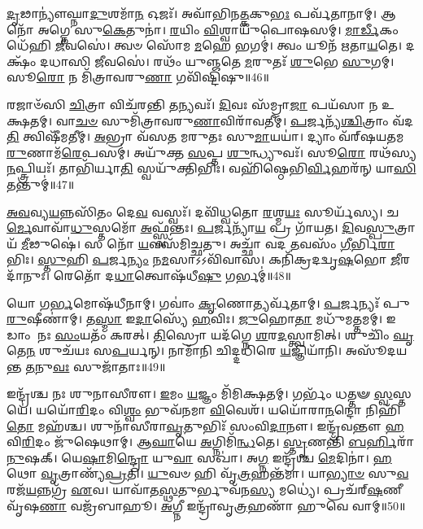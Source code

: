 \-\ul{𑌦𑍃}\-𑌢𑌾𑌨𑍍𑌯𑍗॑𑌘𑍍𑌨𑌾\-\ul{𑌦𑍁}\-𑌶𑌮𑌾᳴\-\ul{𑌨} 𑌓𑌜𑌃᳴।
𑌅𑌵𑌾᳴𑌭𑌿𑌨\-\ul{𑌤𑍍𑌕}\-𑌕𑍁\-\ul{𑌭𑌃} 𑌪𑌰𑍍𑌵᳴𑌤𑌾𑌨𑌾𑌮𑍍।
𑌆 𑌨𑍋᳴ 𑌅𑌗𑍍𑌨𑍇 𑌸𑍁\-\ul{𑌕𑍇}\-𑌤𑍁𑌨𑌾॑।
\-\ul{𑌰}\-𑌯𑌿𑌂 \ul{𑌵𑌿}\-𑌶𑍍𑌵𑌾𑌯𑍁᳴𑌪𑍋𑌷𑌸𑌮𑍍।
\-\ul{𑌮𑌾}\-\-\ul{𑌰𑍍𑌡𑍀}\-𑌕𑌂 𑌧𑍇᳴𑌹𑌿 \ul{𑌜𑍀}\-𑌵𑌸𑍇॑।
𑌤𑍍𑌵𑍞 𑌸𑍋᳴𑌮 \ul{𑌮}\-𑌹𑍇 𑌭𑌗𑌮𑍍॑।
𑌤𑍍𑌵𑌂 𑌯𑍂𑌨᳴ 𑌋𑌤𑌾\-\ul{𑌯}\-𑌤𑍇।
𑌦𑌕𑍍𑌷𑌂᳴ 𑌦𑌧𑌾𑌸𑌿 \ul{𑌜𑍀}\-𑌵𑌸𑍇॑।
𑌰𑌥𑌂᳴ 𑌯𑍁𑌞𑍍𑌜𑌤𑍇 \ul{𑌮}\-𑌰𑍁𑌤𑌃᳴ \ul{𑌶𑍁}\-𑌭𑍇 \ul{𑌸𑍁}\-𑌗𑌮𑍍।
𑌸𑍂\-\ul{𑌰𑍋} 𑌨 𑌮𑌿᳴𑌤𑍍𑌰𑌾𑌵𑌰𑍁\-\ul{𑌣𑌾} 𑌗𑌵𑌿᳴𑌷𑍍𑌟𑌿𑌷𑍁॥46॥

𑌰𑌜𑌾𑍞᳴𑌸𑌿 \ul{𑌚𑌿}\-𑌤𑍍𑌰𑌾 𑌵𑌿𑌚᳴𑌰𑌨𑍍𑌤𑌿 \ul{𑌤}\-𑌨𑍍𑌯𑌵𑌃᳴।
\-\ul{𑌦𑌿}\-𑌵𑌃 𑌸᳴𑌮𑍍𑌰𑌾\-\ul{𑌜𑌾} 𑌪𑌯᳴𑌸𑌾 𑌨 𑌉𑌕𑍍𑌷𑌤𑌮𑍍।
𑌵𑌾\-\ul{𑌚}\-\-\ul{𑍞} 𑌸𑍁𑌮𑌿᳴𑌤𑍍𑌰𑌾𑌵𑌰𑍁\-\ul{𑌣𑌾}\-𑌵𑌿𑌰𑌾᳴𑌵𑌤𑍀𑌮𑍍।
\-\ul{𑌪}\-𑌰𑍍𑌜𑌨𑍍𑌯᳴\-\ul{𑌶𑍍𑌚𑌿}\-𑌤𑍍𑌰𑌾𑌂 𑌵᳴𑌦\-\ul{𑌤𑌿} 𑌤𑍍𑌵𑌿𑌷𑍀᳴𑌮𑌤𑍀𑌮𑍍।
\-\ul{𑌅}\-𑌭𑍍𑌰𑌾 𑌵᳴𑌸𑌤 𑌮𑌰𑍁𑌤𑌃 𑌸𑍁\-\ul{𑌮𑌾}\-𑌯𑌯𑌾॑।
𑌦𑍍𑌯𑌾𑌂 𑌵᳴𑌰𑍍‌\mbox{}𑌷𑌯𑌤𑌮\-\ul{𑌰𑍁}\-𑌣𑌾𑌮᳴\-\ul{𑌰𑍇}\-𑌪𑌸𑌮𑍍॑।
𑌅𑌯𑍁᳴𑌕𑍍𑌤 \ul{𑌸}\-𑌪𑍍𑌤 \ul{𑌶𑍁}\-𑌨𑍍𑌧𑍍𑌯𑍁𑌵𑌃᳴।
𑌸𑍂\-\ul{𑌰𑍋} 𑌰𑌥᳴𑌸𑍍𑌯 \ul{𑌨}\-𑌪𑍍𑌤𑍍𑌰𑌿𑌯𑌃᳴।
𑌤𑌾𑌭𑌿᳴𑌰𑍍𑌯𑌾\-\ul{𑌤𑌿} 𑌸𑍍𑌵𑌯𑍁᳴𑌕𑍍𑌤𑌿𑌭𑌿𑌃।
𑌵𑌹𑌿᳴𑌷𑍍𑌠𑍇𑌭𑌿\-\ul{𑌰𑍍𑌵𑌿}\-𑌹𑌰᳴𑌨𑍍 𑌯𑌾\-\ul{𑌸𑌿} 𑌤𑌨𑍍𑌤𑍁𑌮𑍍॑॥47॥

\-\ul{𑌅}\-\-\ul{𑌵}\-𑌵𑍍𑌯\-\ul{𑌯}\-𑌨𑍍𑌨𑌸𑌿᳴𑌤𑌂 𑌦𑍇\-\ul{𑌵} 𑌵𑌸𑍍𑌵𑌃᳴।
𑌦𑌵𑌿᳴𑌧𑍍𑌵𑌤𑍋 \ul{𑌰}\-𑌶𑍍𑌮\-\ul{𑌯𑌃} 𑌸𑍂𑌰𑍍𑌯᳴𑌸𑍍𑌯।
𑌚\-\ul{𑌰𑍍𑌮𑍇}\-𑌵𑌾𑌵𑌾᳴\-\ul{𑌧𑍁}\-𑌸𑍍𑌤𑌮𑍋᳴ \ul{𑌅}\-𑌫𑍍𑌸𑍍𑌵᳴𑌨𑍍𑌤𑌃।
\-\ul{𑌪}\-𑌰𑍍𑌜𑌨𑍍𑌯𑌾᳴\-\ul{𑌯} 𑌪𑍍𑌰 𑌗𑌾᳴𑌯𑌤।
\-\ul{𑌦𑌿}\-𑌵\-\ul{𑌸𑍍𑌪𑍁}\-𑌤𑍍𑌰𑌾𑌯᳴ \ul{𑌮𑍀}\-𑌢𑍁𑌷𑍇॑।
𑌸 𑌨𑍋᳴ \ul{𑌯}\-𑌵𑌸᳴𑌮𑌿𑌚𑍍𑌛𑌤𑍁।
𑌅𑌚𑍍𑌛𑌾᳴ 𑌵𑌦 \ul{𑌤}\-𑌵𑌸𑌂᳴ \ul{𑌗𑍀}\-𑌰𑍍𑌭𑌿\-\ul{𑌰𑌾}\-𑌭𑌿𑌃।
\-\ul{𑌸𑍍𑌤𑍁}\-𑌹𑌿 \ul{𑌪}\-𑌰𑍍𑌜\-\ul{𑌨𑍍𑌯𑌂} 𑌨\-\ul{𑌮}\-𑌸𑌾\-𑌽𑌽𑌵𑌿᳴𑌵𑌾𑌸।
𑌕𑌨𑌿᳴𑌕𑍍𑌰𑌦𑌦𑍍𑌵𑍃\-\ul{𑌷}\-𑌭𑍋 \ul{𑌜𑍀}\-𑌰𑌦𑌾᳴𑌨𑍁𑌃।
𑌰𑍇𑌤𑍋᳴ 𑌦\-\ul{𑌧𑌾}\-𑌤𑍍𑌵𑍋𑌷᳴𑌧𑍀\-\ul{𑌷𑍁} 𑌗𑌰𑍍𑌭𑌮𑍍॑॥48॥

𑌯𑍋 𑌗\-\ul{𑌰𑍍𑌭}\-𑌮𑍋𑌷᳴𑌧𑍀𑌨𑌾𑌮𑍍।
𑌗𑌵𑌾𑌂॑ \ul{𑌕𑍃}\-𑌣𑍋𑌤𑍍𑌯𑌰𑍍𑌵᳴𑌤𑌾𑌮𑍍।
\-\ul{𑌪}\-𑌰𑍍𑌜𑌨𑍍𑌯𑌃᳴ 𑌪𑍁\-\ul{𑌰𑍁}\-𑌷𑍀𑌣𑌾॑𑌮𑍍।
𑌤\-\ul{𑌸𑍍𑌮𑌾} 𑌇\-\ul{𑌦𑌾}\-𑌸𑍍𑌯𑍇᳴ \ul{𑌹}\-𑌵𑌿𑌃।
\-\ul{𑌜𑍁}\-𑌹𑍋\-\ul{𑌤𑌾} 𑌮𑌧𑍁᳴𑌮𑌤𑍍𑌤𑌮𑌮𑍍।
𑌇𑌡𑌾𑌂 𑌨𑌃 \ul{𑌸𑌂}\-𑌯𑌤𑌂᳴ 𑌕𑌰𑌤𑍍।
\-\ul{𑌤𑌿}\-𑌸𑍍𑌰𑍋 𑌯𑌦᳴𑌗𑍍𑌨𑍇 \ul{𑌶}\-𑌰\-\ul{𑌦}\-𑌸𑍍𑌤𑍍𑌵𑌾𑌮𑌿𑌤𑍍।
𑌶𑍁𑌚𑌿𑌂᳴ \ul{𑌘𑍃}\-𑌤𑍇\-\ul{𑌨} 𑌶𑍁𑌚᳴𑌯𑌃 𑌸\-\ul{𑌪}\-𑌰𑍍𑌯𑌨𑍍।
𑌨𑌾𑌮𑌾᳴𑌨𑌿 𑌚𑌿𑌦𑍍𑌦𑌧𑌿𑌰𑍇 \ul{𑌯}\-𑌜𑍍𑌞𑌿𑌯𑌾᳴𑌨𑌿।
𑌅𑌸𑍂᳴𑌦𑌯𑌨𑍍𑌤 \ul{𑌤}\-𑌨𑍁\-\ul{𑌵𑌃} 𑌸𑍁𑌜𑌾᳴𑌤𑌾𑌃॥49॥

𑌇𑌨𑍍𑌦𑍍𑌰᳴𑌶𑍍𑌚 𑌨𑌃 𑌶𑍁𑌨𑌾𑌸𑍀𑌰𑍗।
\-\ul{𑌇}\-𑌮𑌂 \ul{𑌯}\-𑌜𑍍𑌞𑌂 𑌮𑌿᳴𑌮𑌿𑌕𑍍𑌷𑌤𑌮𑍍।
𑌗𑌰𑍍𑌭𑌂᳴ 𑌧𑌤𑍍𑌤𑍟 \ul{𑌸𑍍𑌵}\-𑌸𑍍𑌤𑌯𑍇॑।
𑌯𑌯𑍋᳴\-\ul{𑌰𑌿}\-𑌦𑌂 𑌵𑌿\-\ul{𑌶𑍍𑌵𑌂} 𑌭𑍁𑌵᳴𑌨𑌮𑌾 \ul{𑌵𑌿}\-𑌵𑍇𑌶᳴।
𑌯𑌯𑍋᳴𑌰𑌾\-\ul{𑌨}\-𑌨𑍍𑌦𑍋 𑌨𑌿𑌹𑌿᳴\-\ul{𑌤𑍋} 𑌮𑌹᳴𑌶𑍍𑌚।
𑌶𑍁𑌨𑌾᳴𑌸𑍀𑌰𑌾\-\ul{𑌵𑍃}\-𑌤𑍁𑌭𑌿𑌃᳴ 𑌸𑌂𑌵𑌿\-\ul{𑌦𑌾}\-𑌨𑍗।
𑌇𑌨𑍍𑌦𑍍𑌰᳴𑌵𑌨𑍍𑌤𑍗 \ul{𑌹}\-𑌵𑌿\-\ul{𑌰𑌿}\-𑌦𑌂 𑌜𑍁᳴𑌷𑍇𑌥𑌾𑌮𑍍।
𑌆\-\ul{𑌘𑌾}\-𑌯𑍇 \ul{𑌅}\-𑌗𑍍𑌨𑌿𑌮𑌿᳴\-\ul{𑌨𑍍𑌧}\-𑌤𑍇।
\-\ul{𑌸𑍍𑌤𑍃}\-𑌣𑌨𑍍𑌤𑌿᳴ \ul{𑌬}\-\-\ul{𑌰𑍍}\-𑌹𑌿𑌰𑌾᳴\-\ul{𑌨𑍁}\-𑌷𑌕𑍍।
𑌯𑍇\-\ul{𑌷𑌾}\-𑌮𑌿\-\ul{𑌨𑍍𑌦𑍍𑌰𑍋} 𑌯𑍁\-\ul{𑌵𑌾} 𑌸𑌖𑌾॑।
𑌅\-\ul{𑌗𑍍𑌨} 𑌇𑌨𑍍𑌦𑍍𑌰᳴𑌶𑍍𑌚 \ul{𑌮𑍇}\-𑌦𑌿𑌨𑌾॑।
\-\ul{𑌹}\-𑌥𑍋 \ul{𑌵𑍃}\-𑌤𑍍𑌰𑌾𑌣𑍍𑌯᳴\-\ul{𑌪𑍍𑌰}\-𑌤𑌿।
\-\ul{𑌯𑍁}\-𑌵𑍞 𑌹𑌿 𑌵𑍃᳴\-\ul{𑌤𑍍𑌰}\-𑌹𑌨𑍍𑌤᳴𑌮𑌾।
𑌯𑌾\-\ul{𑌭𑍍𑌯𑌾}\-\-\ul{𑍞} 𑌸𑍁\-\ul{𑌵}\-𑌰𑌜᳴\-\ul{𑌯}\-𑌨𑍍𑌨𑌗𑍍𑌰᳴ \ul{𑌏}\-𑌵।
𑌯𑌾𑌵𑌾᳴𑌤\-\ul{𑌸𑍍𑌥}\-𑌤𑍁𑌰𑍍𑌭𑍁𑌵᳴𑌨\-\ul{𑌸𑍍𑌯} 𑌮𑌧𑍍𑌯𑍇॑।
𑌪𑍍𑌰𑌚᳴𑌰𑍍‌\mbox{}\-\ul{𑌷}\-𑌣𑍀 𑌵𑍃᳴𑌷\-\ul{𑌣𑌾} 𑌵𑌜𑍍𑌰᳴𑌬𑌾𑌹𑍂।
\-\ul{𑌅}\-𑌗𑍍𑌨𑍀 𑌇𑌨𑍍𑌦𑍍𑌰𑌾᳴𑌵𑍃\-\ul{𑌤𑍍𑌰}\-𑌹𑌣𑌾᳴ 𑌹𑍁𑌵𑍇 𑌵𑌾𑌮𑍍॥50॥\anuvakamend[𑌮\-\ul{𑌨} 𑌇\-\ul{𑌨𑍍𑌦𑍍𑌰𑍋} 𑌗𑌵𑌿᳴𑌷𑍍𑌟𑌿\-\ul{𑌷𑍁} 𑌤\-\ul{𑌨𑍍𑌤𑍁𑌂} 𑌗\-\ul{𑌰𑍍𑌭}\-\-\ul{𑍞} 𑌸𑍁𑌜𑌾᳴\-\ul{𑌤𑌾𑌃} 𑌸𑌖𑌾᳴ \ul{𑌸}\-𑌪𑍍𑌤 𑌚᳴]

